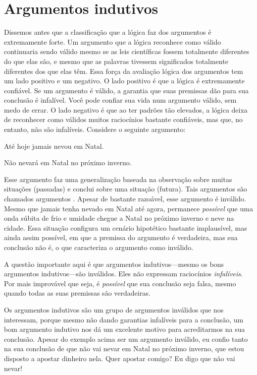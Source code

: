 \section{Argumentos indutivos}
Dissemos antes que a classificação que a lógica faz dos argumentos é extremamente forte. 
Um argumento que a lógica reconhece como válido continuaria sendo válido mesmo se as leis científicas fossem totalmente diferentes do que elas são, e mesmo que as palavras tivessem significados totalmente diferentes dos que elas têm.
Essa força da avaliação lógica dos argumentos tem um lado positivo e um negativo.
O lado positivo é que a lógica é extremamente confiável.
Se um argumento é válido, a garantia que suas premissas dão para sua conclusão é infalível.
Você pode confiar sua vida num argumento válido, sem medo de errar.
O lado negativo é que ao ter padrões tão elevados, a lógica deixa de reconhecer como válidos muitos raciocínios bastante confiáveis, mas que, no entanto, não são infalíveis.
Considere o seguinte argumento:
	\begin{earg}
		\item[] Até hoje jamais nevou em Natal.
	\item[\therefore] Não nevará em Natal no próximo inverno.
\end{earg}
Esse argumento faz uma generalização baseada na observação sobre muitas situações (passadas) e conclui sobre uma situação (futura).
Tais argumentos são chamados argumentos .
Apesar de bastante razoável, esse argumento é inválido.
Mesmo que jamais tenha nevado em Natal até agora, permanece \emph{possível} que 
uma onda súbita de frio e umidade chegue a Natal no próximo inverno e neve na cidade.
Essa situação configura um cenário hipotético bastante implausível, mas ainda assim possível, em que a premissa do argumento é verdadeira, mas sua conclusão não é, o que caracteriza o argumento como inválido.

A questão importante aqui é que argumentos indutivos---mesmo os bons argumentos indutivos---são inválidos.
Eles não expressam raciocínios  \emph{infalíveis}.
Por mais improvável que seja, é \emph{possível} que sua conclusão seja falsa, mesmo quando todas as suas premissas são verdadeiras.

Os argumentos indutivos são um grupo de argumentos inválidos que nos interessam, porque mesmo não dando garantias infalíveis para a conclusão, um bom argumento indutivo nos dá um excelente motivo para acreditarmos na sua conclusão.
Apesar do exemplo acima ser um argumento inválido, eu confio tanto na sua conclusão de que não vai nevar em Natal no próximo inverno, que estou disposto a apostar dinheiro nela. Quer apostar comigo? Eu digo que não vai nevar!

